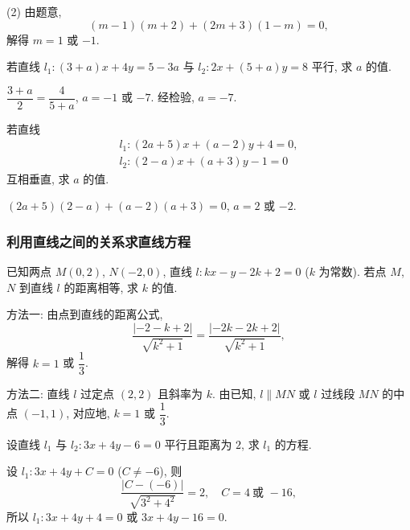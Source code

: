     (2) 由题意, 
    \[(m-1)(m+2)+ (2m+3)(1-m)= 0,\]
    解得 $m=1$ 或 $-1$.
\endsolution

\lianxi
\begin{exercise}
    若直线 $l_1 \colon (3+a)x+4y=5-3a$ 与 $l_2 \colon 2x+(5+a)y=8$ 平行, 求 $a$ 的值.
\end{exercise}
\beginsolution
    $\dfrac{3+a}2= \dfrac4{5+a}$, $a=-1$ 或 $-7$. 经检验, $a=-7$.
\endsolution

\begin{exercise}
    若直线 
    \[\begin{gathered}
        l_1\colon (2a+5)x+(a-2)y+4=0,\\
        l_2\colon (2-a)x+(a+3)y-1=0
    \end{gathered}\]
    互相垂直, 求 $a$ 的值.
\end{exercise}
\beginsolution
    $(2a+5)(2-a)+ (a-2)(a+3)= 0$, $a=2$ 或 $-2$.
\endsolution

\subsubsection{利用直线之间的关系求直线方程}
\begin{example}
    已知两点 $M(0, 2)$, $N(-2, 0)$, 直线 $l\colon kx-y-2k+2=0$ ($k$ 为常数). 若点 $M$, $N$ 到直线 $l$ 的距离相等, 求 $k$ 的值.
\end{example}
\beginsolution
    方法一: 由点到直线的距离公式,
    \[\frac{|-2-k+2|}{\sqrt{k^2+1}}= 
    \frac{|-2k-2k+2|}{\sqrt{k^2+1}},\]
    解得 $k=1$ 或 $\dfrac13$.

    方法二: 直线 $l$ 过定点 $(2,2)$ 且斜率为 $k$. 由已知, $l\parallel MN$ 或 $l$ 过线段 $MN$ 的中点 $(-1,1)$, 对应地, $k=1$ 或 $\dfrac13$.
\endsolution

\lianxi
\begin{exercise}[s]
    设直线 $l_1$ 与 $l_2\colon 3x+4y-6=0$ 平行且距离为 $2$, 求 $l_1$ 的方程.
\end{exercise}
\beginsolution
    设 $l_1\colon 3x+4y+C=0$ ($C\neq -6$), 则
    \[\frac{|C-(-6)|}{\sqrt{3^2+4^2}}= 2,\quad
    C= 4\ \text{或\ } -16,\]
    所以 $l_1\colon 3x+4y+4=0$ 或 $3x+4y-16=0$.
\endsolution

